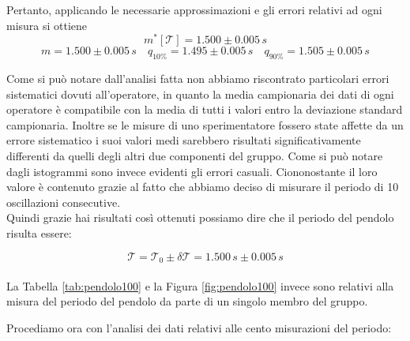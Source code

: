 Pertanto, applicando le necessarie approssimazioni e gli errori relativi ad ogni misura si ottiene
\begin{equation*}
m^*[\mathcal{T}] = 1.500 \pm 0.005\,s
\end{equation*}
\begin{equation*}
m = 1.500 \pm 0.005\,s  \quad
q_{10\%} = 1.495 \pm 0.005\,s \quad
q_{90\%} = 1.505 \pm 0.005\,s
\end{equation*}

Come si può notare dall'analisi fatta non abbiamo riscontrato particolari errori sistematici dovuti all'operatore, in quanto la media campionaria dei dati di ogni operatore è compatibile con la media di tutti i valori entro la deviazione standard campionaria. Inoltre se le misure di uno sperimentatore fossero state affette da un errore sistematico i suoi valori medi sarebbero risultati significativamente differenti da quelli degli altri due componenti del gruppo.
Come si può notare dagli istogrammi sono invece evidenti gli errori casuali. Ciononostante il loro valore è contenuto grazie al fatto che abbiamo deciso di misurare il periodo di 10 oscillazioni consecutive.\\
Quindi grazie hai risultati così ottenuti possiamo dire che il periodo del pendolo risulta essere:

\begin{equation}
\mathcal{T} = \mathcal{T}_0 \pm \delta\mathcal{T} = 1.500\,s \pm 0.005\,s
\end{equation}\\

La Tabella \ref{tab:pendolo100} e la Figura \ref{fig:pendolo100} invece sono relativi alla misura del periodo del pendolo da parte di un singolo membro del gruppo.


Procediamo ora con l'analisi dei dati relativi alle cento misurazioni del periodo:

